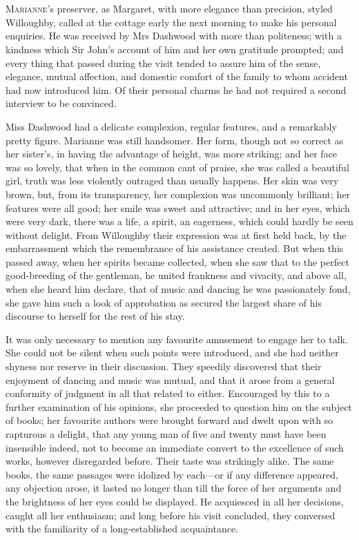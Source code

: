 \chapter[Chapter \thechapter]{}
\lettrine[lines=4,lraise=0.3]{M}{arianne}’s preserver, as Margaret, with more elegance than precision, styled Willoughby, called at the cottage early the next morning to make his personal enquiries. He was received by Mrs Dashwood with more than politeness; with a kindness which Sir John’s account of him and her own gratitude prompted; and every thing that passed during the visit tended to assure him of the sense, elegance, mutual affection, and domestic comfort of the family to whom accident had now introduced him. Of their personal charms he had not required a second interview to be convinced.

Miss Dashwood had a delicate complexion, regular features, and a remarkably pretty figure. Marianne was still handsomer. Her form, though not so correct as her sister’s, in having the advantage of height, was more striking; and her face was so lovely, that when in the common cant of praise, she was called a beautiful girl, truth was less violently outraged than usually happens. Her skin was very brown, but, from its transparency, her complexion was uncommonly brilliant; her features were all good; her smile was sweet and attractive; and in her eyes, which were very dark, there was a life, a spirit, an eagerness, which could hardly be seen without delight. From Willoughby their expression was at first held back, by the embarrassment which the remembrance of his assistance created. But when this passed away, when her spirits became collected, when she saw that to the perfect good-breeding of the gentleman, he united frankness and vivacity, and above all, when she heard him declare, that of music and dancing he was passionately fond, she gave him such a look of approbation as secured the largest share of his discourse to herself for the rest of his stay.

It was only necessary to mention any favourite amusement to engage her to talk. She could not be silent when such points were introduced, and she had neither shyness nor reserve in their discussion. They speedily discovered that their enjoyment of dancing and music was mutual, and that it arose from a general conformity of judgment in all that related to either. Encouraged by this to a further examination of his opinions, she proceeded to question him on the subject of books; her favourite authors were brought forward and dwelt upon with so rapturous a delight, that any young man of five and twenty must have been insensible indeed, not to become an immediate convert to the excellence of such works, however disregarded before. Their taste was strikingly alike. The same books, the same passages were idolized by each—or if any difference appeared, any objection arose, it lasted no longer than till the force of her arguments and the brightness of her eyes could be displayed. He acquiesced in all her decisions, caught all her enthusiasm; and long before his visit concluded, they conversed with the familiarity of a long-established acquaintance.

